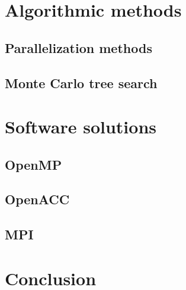 \documentclass[12pt]{article}
\begin{document}
\section{Algorithmic methods}				\label{sec:introduction}
	\subsection{Parallelization methods}		\label{sec:parallelization}		
	\subsection{Monte Carlo tree search}		\label{sec:mcts}
\newpage

\section{Software solutions}				\label{sec:introduction}
	\subsection{OpenMP}				\label{sec:openmp}
	\subsection{OpenACC}				\label{sec:openacc}
	\subsection{MPI}					\label{sec:mpi}
\newpage

\section{Conclusion}					\label{sec:conclusion}		
\newpage

%
%
\end{document}
